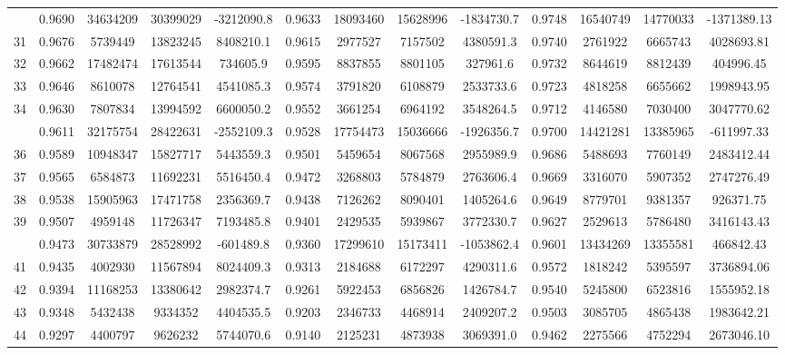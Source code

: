 \documentclass[
  12pt,
]{article}
\begin{document}
\begin{longtable}[t]{lcccccccccccc}
\addlinespace
30 & 0.9690 & 34634209 & 30399029 & -3212090.8 & 0.9633 & 18093460 & 15628996 & -1834730.7 & 0.9748 & 16540749 & 14770033 & -1371389.13\\
31 & 0.9676 & 5739449 & 13823245 & 8408210.1 & 0.9615 & 2977527 & 7157502 & 4380591.3 & 0.9740 & 2761922 & 6665743 & 4028693.81\\
32 & 0.9662 & 17482474 & 17613544 & 734605.9 & 0.9595 & 8837855 & 8801105 & 327961.6 & 0.9732 & 8644619 & 8812439 & 404996.45\\
33 & 0.9646 & 8610078 & 12764541 & 4541085.3 & 0.9574 & 3791820 & 6108879 & 2533733.6 & 0.9723 & 4818258 & 6655662 & 1998943.95\\
34 & 0.9630 & 7807834 & 13994592 & 6600050.2 & 0.9552 & 3661254 & 6964192 & 3548264.5 & 0.9712 & 4146580 & 7030400 & 3047770.62\\
\addlinespace
35 & 0.9611 & 32175754 & 28422631 & -2552109.3 & 0.9528 & 17754473 & 15036666 & -1926356.7 & 0.9700 & 14421281 & 13385965 & -611997.33\\
36 & 0.9589 & 10948347 & 15827717 & 5443559.3 & 0.9501 & 5459654 & 8067568 & 2955989.9 & 0.9686 & 5488693 & 7760149 & 2483412.44\\
37 & 0.9565 & 6584873 & 11692231 & 5516450.4 & 0.9472 & 3268803 & 5784879 & 2763606.4 & 0.9669 & 3316070 & 5907352 & 2747276.49\\
38 & 0.9538 & 15905963 & 17471758 & 2356369.7 & 0.9438 & 7126262 & 8090401 & 1405264.6 & 0.9649 & 8779701 & 9381357 & 926371.75\\
39 & 0.9507 & 4959148 & 11726347 & 7193485.8 & 0.9401 & 2429535 & 5939867 & 3772330.7 & 0.9627 & 2529613 & 5786480 & 3416143.43\\
\addlinespace
40 & 0.9473 & 30733879 & 28528992 & -601489.8 & 0.9360 & 17299610 & 15173411 & -1053862.4 & 0.9601 & 13434269 & 13355581 & 466842.43\\
41 & 0.9435 & 4002930 & 11567894 & 8024409.3 & 0.9313 & 2184688 & 6172297 & 4290311.6 & 0.9572 & 1818242 & 5395597 & 3736894.06\\
42 & 0.9394 & 11168253 & 13380642 & 2982374.7 & 0.9261 & 5922453 & 6856826 & 1426784.7 & 0.9540 & 5245800 & 6523816 & 1555952.18\\
43 & 0.9348 & 5432438 & 9334352 & 4404535.5 & 0.9203 & 2346733 & 4468914 & 2409207.2 & 0.9503 & 3085705 & 4865438 & 1983642.21\\
44 & 0.9297 & 4400797 & 9626232 & 5744070.6 & 0.9140 & 2125231 & 4873938 & 3069391.0 & 0.9462 & 2275566 & 4752294 & 2673046.10\\

\end{longtable}
\end{document}

